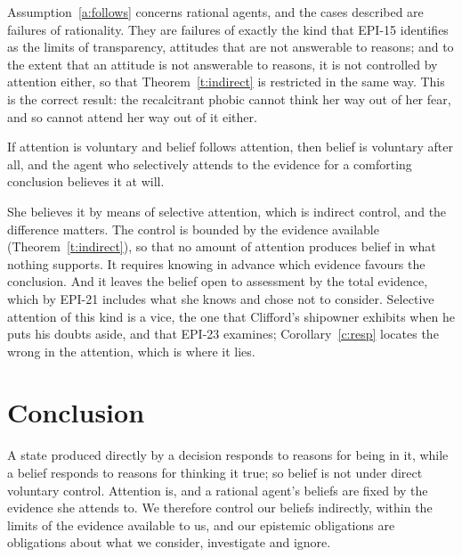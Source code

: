 \documentclass{situationist-preprint}
\begin{document}
\begin{reply}
Assumption~\ref{a:follows} concerns rational agents, and the cases described are failures of rationality. They are failures of exactly the kind that EPI-15 identifies as the limits of transparency, attitudes that are not answerable to reasons; and to the extent that an attitude is not answerable to reasons, it is not controlled by attention either, so that Theorem~\ref{t:indirect} is restricted in the same way. This is the correct result: the recalcitrant phobic cannot think her way out of her fear, and so cannot attend her way out of it either.
\end{reply}

\begin{objection}
If attention is voluntary and belief follows attention, then belief is voluntary after all, and the agent who selectively attends to the evidence for a comforting conclusion believes it at will.
\end{objection}

\begin{reply}
She believes it by means of selective attention, which is indirect control, and the difference matters. The control is bounded by the evidence available (Theorem~\ref{t:indirect}), so that no amount of attention produces belief in what nothing supports. It requires knowing in advance which evidence favours the conclusion. And it leaves the belief open to assessment by the total evidence, which by EPI-21 includes what she knows and chose not to consider. Selective attention of this kind is a vice, the one that Clifford's shipowner exhibits when he puts his doubts aside, and that EPI-23 examines; Corollary~\ref{c:resp} locates the wrong in the attention, which is where it lies.
\end{reply}

\section{Conclusion}

A state produced directly by a decision responds to reasons for being in it, while a belief responds to reasons for thinking it true; so belief is not under direct voluntary control. Attention is, and a rational agent's beliefs are fixed by the evidence she attends to. We therefore control our beliefs indirectly, within the limits of the evidence available to us, and our epistemic obligations are obligations about what we consider, investigate and ignore.
\end{document}

